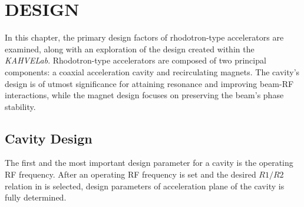 \documentclass[a4paper,oneside,12pt]{report}
\numberwithin{equation}{chapter}
\begin{document}

\chapter{DESIGN}


In this chapter, the primary design factors of rhodotron-type accelerators are examined, along with an exploration of the design created within the \textit{KAHVELab}. 
Rhodotron-type accelerators are composed of two principal components: a coaxial acceleration cavity and recirculating magnets. 
The cavity's design is of utmost significance for attaining resonance and improving beam-RF interactions, while the magnet design focuses on preserving the beam's phase stability.

\section{Cavity Design} \label{sec:cavity_design}

The first and the most important design parameter for a cavity is the operating RF frequency.
After an operating RF frequency is set and the desired $R1/R2$ relation in  is selected, design parameters of acceleration plane of the cavity is fully determined.
\end{document}
